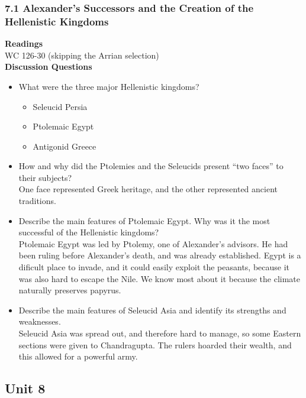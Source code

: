\documentclass{article}
\begin{document}
\subsubsection*{7.1 Alexander’s Successors and the Creation of the Hellenistic Kingdoms}
\textbf{Readings} \\
WC 126-30 (skipping the Arrian selection) \\
\textbf{Discussion Questions}
\begin{itemize}
  \item What were the three major Hellenistic kingdoms? \\
  \begin{itemize}
    \item Seleucid Persia
    \item Ptolemaic Egypt
    \item Antigonid Greece
  \end{itemize}
  \item How and why did the Ptolemies and the Seleucids present “two faces” to their
  subjects? \\
  One face represented Greek heritage, and the other represented ancient traditions.
  \item Describe the main features of Ptolemaic Egypt. Why was it the most successful of
  the Hellenistic kingdoms? \\
  Ptolemaic Egypt was led by Ptolemy, one of Alexander's advisors. He had been ruling before
  Alexander's death, and was already established. Egypt is a dificult place to invade, and
  it could easily exploit the peasants, because it was also hard to escape the Nile. We know
  most about it because the climate naturally preserves papyrus.
  \item Describe the main features of Seleucid Asia and identify its strengths and
  weaknesses. \\
  Seleucid Asia was spread out, and therefore hard to manage, so some Eastern sections
  were given to Chandragupta. The rulers hoarded their wealth, and this allowed for a
  powerful army.
\end{itemize}
\subsection*{Unit 8}
\end{document}
